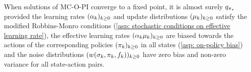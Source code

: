 


\begin{conjecture}
\label{con: greedy conjecture}
    When solutions of MC-O-PI converge to a fixed point, it is almost surely $q_{{\pi}_*}$
    provided
    the learning rates $(\alpha_k)_{k \geq 0}$ and update distributions $(\mu_k)_{k \geq 0}$ satisfy the modified Robbins-Monro conditions (\autoref{asp: stochastic conditions on effective learning rate}),
    the effective learning rates $(\alpha_k \mu_k)_{k \geq 0}$ are biased towards the actions of the corresponding policies $(\pi_k)_{k \geq 0}$ in all states (\autoref{asp: on-policy bias})
    and
    the noise distributions $(w(\sigma_k, \pi_k, f_k))_{k \geq 0}$ have zero bias and non-zero variance for all state-action pairs.
\end{conjecture}

\vspace{-0.6cm}





